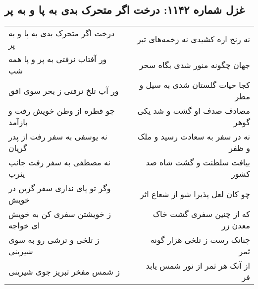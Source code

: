 \begin{center}
\section*{غزل شماره ۱۱۴۲: درخت اگر متحرک بدی به پا و به پر}
\label{sec:1142}
\begin{longtable}{l p{0.5cm} r}
درخت اگر متحرک بدی به پا و به پر
&&
نه رنج اره کشیدی نه زخمه‌های تبر
\\
ور آفتاب نرفتی به پر و پا همه شب
&&
جهان چگونه منور شدی بگاه سحر
\\
ور آب تلخ نرفتی ز بحر سوی افق
&&
کجا حیات گلستان شدی به سیل و مطر
\\
چو قطره از وطن خویش رفت و بازآمد
&&
مصادف صدف او گشت و شد یکی گوهر
\\
نه یوسفی به سفر رفت از پدر گریان
&&
نه در سفر به سعادت رسید و ملک و ظفر
\\
نه مصطفی به سفر رفت جانب یثرب
&&
بیافت سلطنت و گشت شاه صد کشور
\\
وگر تو پای نداری سفر گزین در خویش
&&
چو کان لعل پذیرا شو از شعاع اثر
\\
ز خویشتن سفری کن به خویش ای خواجه
&&
که از چنین سفری گشت خاک معدن زر
\\
ز تلخی و ترشی رو به سوی شیرینی
&&
چنانک رست ز تلخی هزار گونه ثمر
\\
ز شمس مفخر تبریز جوی شیرینی
&&
از آنک هر ثمر از نور شمس یابد فر
\\
\end{longtable}
\end{center}
